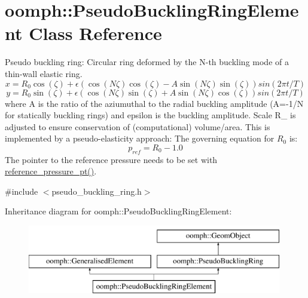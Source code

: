 \hypertarget{classoomph_1_1PseudoBucklingRingElement}{}\section{oomph\+:\+:Pseudo\+Buckling\+Ring\+Element Class Reference}
\label{classoomph_1_1PseudoBucklingRingElement}


Pseudo buckling ring\+: Circular ring deformed by the N-\/th buckling mode of a thin-\/wall elastic ring. \[ x = R_0 \cos(\zeta) + \epsilon \left( \cos(N \zeta) \cos(\zeta) - A \sin(N \zeta) \sin(\zeta) \right) sin(2 \pi t/T) \] \[ y = R_0 \sin(\zeta) + \epsilon \left( \cos(N \zeta) \sin(\zeta) + A \sin(N \zeta) \cos(\zeta) \right) sin(2 \pi t/T) \] where A is the ratio of the aziumuthal to the radial buckling amplitude (A=-\/1/N for statically buckling rings) and epsilon is the buckling amplitude. Scale R\+\_ is adjusted to ensure conservation of (computational) volume/area. This is implemented by a pseudo-\/elasticity approach\+: The governing equation for $ R_0 $ is\+: \[ p_{ref} = R_0 - 1.0 \] The pointer to the reference pressure needs to be set with \hyperlink{classoomph_1_1PseudoBucklingRingElement_aee6f3e5157ff065ddc132d24496b9378}{reference\+\_\+pressure\+\_\+pt()}.  




{\ttfamily \#include $<$pseudo\+\_\+buckling\+\_\+ring.\+h$>$}

Inheritance diagram for oomph\+:\+:Pseudo\+Buckling\+Ring\+Element\+:\begin{figure}[H]
\begin{center}
\leavevmode
\includegraphics[height=3.000000cm]{classoomph_1_1PseudoBucklingRingElement}
\end{center}
\end{figure}
